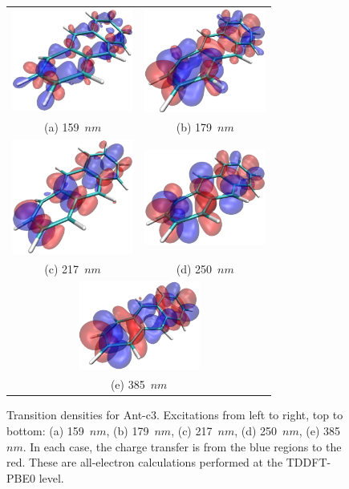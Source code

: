 \documentclass[aip,reprint,nofootinbib]{revtex4-1}
\begin{document}
\begin{figure}
\begin{tabular}{cc}
\includegraphics[width=4cm]{c3-pk1} &
\includegraphics[width=4cm]{c3-pk2} \\
(a) 159~$nm$ & (b) 179~$nm$ \\
\includegraphics[width=4cm]{c3-pk3} &
\includegraphics[width=4cm]{c3-pk4} \\
(c) 217~$nm$ & (d) 250~$nm$ \\
\multicolumn{2}{c}{\includegraphics[width=4cm]{c3-pk5}}\\
\multicolumn{2}{c}{(e) 385~$nm$}\\
\end{tabular}
\caption[Transition densities for twistacene.]{Transition densities for Ant-c3. Excitations from left to right, top to bottom: (a) 159~$nm$, (b) 179~$nm$, (c) 217~$nm$, (d) 250~$nm$, (e) 385~$nm$. In each case, the charge transfer is from the blue regions to the red. These are all-electron calculations performed at the TDDFT-PBE0 level.}\label{fig:twistapeaks}
\end{figure}
\end{document}
